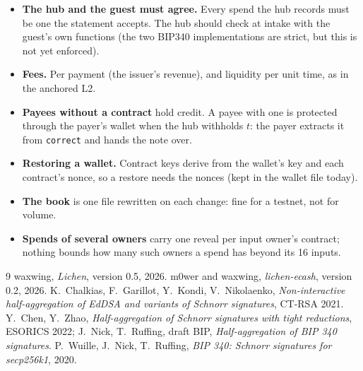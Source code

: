 \documentclass[11pt]{article}
\newcommand{\tx}[1]{\texttt{#1}}
\begin{document}
\begin{itemize}[nosep]
\item \textbf{The hub and the guest must agree.} Every spend the hub
  records must be one the statement accepts. The hub should check at
  intake with the guest's own functions (the two BIP340 implementations
  are strict, but this is not yet enforced).
\item \textbf{Fees.} Per payment (the issuer's revenue), and liquidity
  per unit time, as in the anchored L2.
\item \textbf{Payees without a contract} hold credit. A payee with one
  is protected through the payer's wallet when the hub withholds $t$:
  the payer extracts it from \tx{correct} and hands the note over.
\item \textbf{Restoring a wallet.} Contract keys derive from the wallet's
  key and each contract's nonce, so a restore needs the nonces (kept in
  the wallet file today).
\item \textbf{The book} is one file rewritten on each change: fine for a
  testnet, not for volume.
\item \textbf{Spends of several owners} carry one reveal per input
  owner's contract; nothing bounds how many such owners a spend has
  beyond its 16 inputs.
\end{itemize}

\begin{thebibliography}{9}
 waxwing, \emph{Lichen}, version 0.5, 2026.
 m0wer and waxwing, \emph{lichen-ecash}, version 0.2, 2026.
 K.~Chalkias, F.~Garillot, Y.~Kondi, V.~Nikolaenko,
  \emph{Non-interactive half-aggregation of EdDSA and variants of Schnorr
  signatures}, CT-RSA 2021.
 Y.~Chen, Y.~Zhao, \emph{Half-aggregation of Schnorr
  signatures with tight reductions}, ESORICS 2022; J.~Nick, T.~Ruffing,
  draft BIP, \emph{Half-aggregation of BIP 340 signatures}.
 P.~Wuille, J.~Nick, T.~Ruffing, \emph{BIP 340: Schnorr
  signatures for secp256k1}, 2020.
\end{thebibliography}
\end{document}
